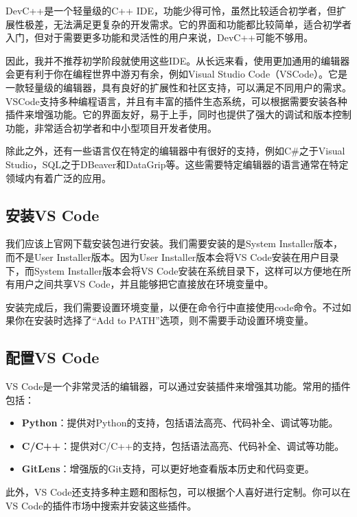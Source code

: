 \documentclass[../main.tex]{subfiles}
\begin{document}
DevC++是一个轻量级的C++ IDE，功能少得可怜，虽然比较适合初学者，但扩展性极差，无法满足更复杂的开发需求。它的界面和功能都比较简单，适合初学者入门，但对于需要更多功能和灵活性的用户来说，DevC++可能不够用。

因此，我并不推荐初学阶段就使用这些IDE。从长远来看，使用更加通用的编辑器会更有利于你在编程世界中游刃有余，例如Visual Studio Code（VSCode）。它是一款轻量级的编辑器，具有良好的扩展性和社区支持，可以满足不同用户的需求。VSCode支持多种编程语言，并且有丰富的插件生态系统，可以根据需要安装各种插件来增强功能。它的界面友好，易于上手，同时也提供了强大的调试和版本控制功能，非常适合初学者和中小型项目开发者使用。

除此之外，还有一些语言仅在特定的编辑器中有很好的支持，例如C\#之于Visual Studio，SQL之于DBeaver和DataGrip等。这些需要特定编辑器的语言通常在特定领域内有着广泛的应用。

\subsection{安装VS Code}

我们应该上官网下载安装包进行安装。我们需要安装的是System Installer版本，而不是User Installer版本。因为User Installer版本会将VS Code安装在用户目录下，而System Installer版本会将VS Code安装在系统目录下，这样可以方便地在所有用户之间共享VS Code，并且能够把它直接放在环境变量中。

安装完成后，我们需要设置环境变量，以便在命令行中直接使用code命令。不过如果你在安装时选择了“Add to PATH”选项，则不需要手动设置环境变量。

\subsection{配置VS Code}

VS Code是一个非常灵活的编辑器，可以通过安装插件来增强其功能。常用的插件包括：

\begin{itemize}
  \item \textbf{Python}：提供对Python的支持，包括语法高亮、代码补全、调试等功能。
  \item \textbf{C/C++}：提供对C/C++的支持，包括语法高亮、代码补全、调试等功能。
  \item \textbf{GitLens}：增强版的Git支持，可以更好地查看版本历史和代码变更。
\end{itemize}

此外，VS Code还支持多种主题和图标包，可以根据个人喜好进行定制。你可以在VS Code的插件市场中搜索并安装这些插件。
\end{document}

